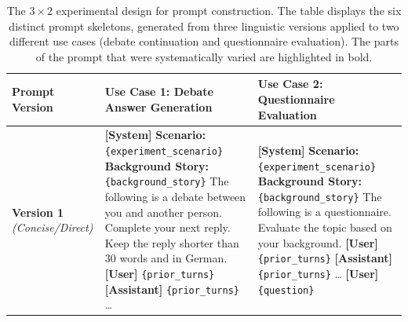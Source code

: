 \begin{table}[htbp] 
    \centering
    \caption{The $3 \times 2$ experimental design for prompt construction. The table displays the six distinct prompt skeletons, generated from three linguistic versions applied to two different use cases (debate continuation and questionnaire evaluation). The parts of the prompt that were systematically varied are highlighted in bold.}
    \label{tab:prompt_skeletons}
    
    \small 
    


    \begin{tabularx}{\textwidth}{@{} l L L @{}}
        \toprule
        \textbf{Prompt Version} & \textbf{Use Case 1: Debate Answer Generation} & \textbf{Use Case 2: Questionnaire Evaluation} \\
        \midrule
        
        \textbf{Version 1} \newline \textit{(Concise/Direct)} & 

        \textbf{[System]} \textbf{Scenario:} \texttt{\{experiment\_scenario\}} \newline \newline
        \textbf{Background Story:} \texttt{\{background\_story\}} \newline \newline
        The following is a debate between you and another person. Complete your next reply. Keep the reply shorter than 30 words and in German. \newline \newline
        \textbf{[User]} \texttt{\{prior\_turns\}} \newline
        \textbf{[Assistant]} \texttt{\{prior\_turns\}} \newline
        \dots &
        
        \textbf{[System]} \textbf{Scenario:} \texttt{\{experiment\_scenario\}} \newline \newline
        \textbf{Background Story:} \texttt{\{background\_story\}} \newline \newline
        The following is a questionnaire. Evaluate the topic based on your background. \newline \newline
        \textbf{[User]} \texttt{\{prior\_turns\}} \newline
        \textbf{[Assistant]} \texttt{\{prior\_turns\}} \newline
        \dots \newline
        \textbf{[User]} \texttt{\{question\}} \\
        \midrule


\end{tabularx}
\end{table}
